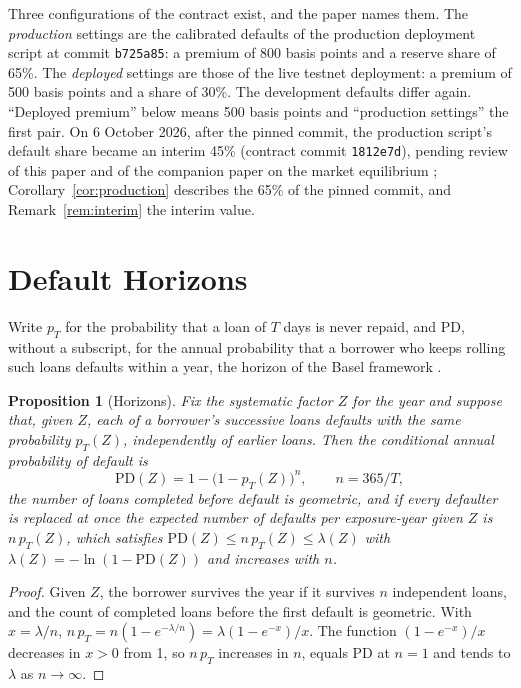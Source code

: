 \documentclass[11pt]{article}
\theoremstyle{plain}
\newtheorem{proposition}{Proposition}
\theoremstyle{definition}
\begin{document}
Three configurations of the contract exist, and the paper names them. The \emph{production} settings
are the calibrated defaults of the production deployment script at commit \texttt{b725a85}: a premium
of 800 basis points and a reserve share of 65\%. The \emph{deployed} settings are those of the live
testnet deployment: a premium of 500 basis points and a share of 30\%. The development defaults differ
again. ``Deployed premium'' below means 500 basis points and ``production settings'' the first pair.
On 6 October 2026, after the pinned commit, the production script's default share became an interim
45\% (contract commit \texttt{1812e7d}), pending review of this paper and of the companion paper on the
market equilibrium \citep{lendingequilibrium2026}; Corollary~\ref{cor:production} describes the 65\% of
the pinned commit, and Remark~\ref{rem:interim} the interim value.

\section{Default Horizons}\label{sec:horizon}

Write $p_T$ for the probability that a loan of $T$ days is never repaid, and PD, without a subscript,
for the annual probability that a borrower who keeps rolling such loans defaults within a year, the
horizon of the Basel framework \citep{bcbs2006}.

\begin{proposition}[Horizons]\label{prop:horizon}
Fix the systematic factor $Z$ for the year and suppose that, given $Z$, each of a borrower's
successive loans defaults with the same probability $p_T(Z)$, independently of earlier loans. Then
the conditional annual probability of default is
\[
  \mathrm{PD}(Z)=1-\bigl(1-p_T(Z)\bigr)^{n},\qquad n=365/T,
\]
the number of loans completed before default is geometric, and if every defaulter is replaced at
once the expected number of defaults per exposure-year given $Z$ is $n\,p_T(Z)$, which satisfies
$\mathrm{PD}(Z)\le n\,p_T(Z)\le\lambda(Z)$ with $\lambda(Z)=-\ln(1-\mathrm{PD}(Z))$ and increases with $n$.
\end{proposition}

\begin{proof}
Given $Z$, the borrower survives the year if it survives $n$ independent loans, and the count of
completed loans before the first default is geometric. With $x=\lambda/n$,
$n\,p_T=n(1-e^{-\lambda/n})=\lambda(1-e^{-x})/x$. The function $(1-e^{-x})/x$ decreases in $x>0$
from 1, so $n\,p_T$ increases in $n$, equals PD at $n=1$ and tends to $\lambda$ as $n\to\infty$.
\end{proof}
\end{document}
